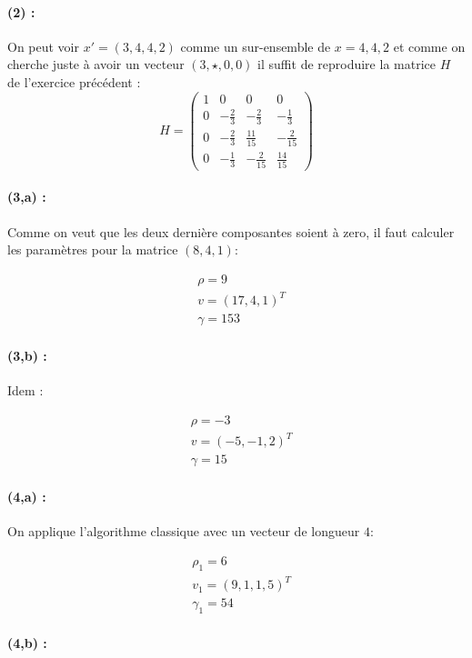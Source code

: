 \documentclass[11pt,a4paper]{report}
\begin{document}
\paragraph*{(2) : } On peut voir $x'=(3,4,4,2)$ comme un sur-ensemble de $x=4,4,2$ et comme on cherche juste à avoir un vecteur $(3,\star,0,0)$ il suffit de reproduire la matrice $H$ de l'exercice précédent :
$$
H = \begin{pmatrix}
1 & 0 & 0 & 0 \\
0 &-\frac{2}{3} & -\frac{2}{3} & -\frac{1}{3} \\
0 &-\frac{2}{3} & \frac{11}{15} & -\frac{2}{15} \\
0 &-\frac{1}{3} & -\frac{2}{15} & \frac{14}{15}
\end{pmatrix}
$$

\paragraph*{(3,a) : } Comme on veut que les deux dernière composantes soient à zero, il faut calculer les paramètres pour la matrice $(8,4,1)$:

\begin{align*}
& \rho = 9 \\
& v = (17,4,1)^T \\
& \gamma = 153
\end{align*}

\paragraph*{(3,b) : } Idem :

\begin{align*}
& \rho = -3 \\
& v = (-5,-1,2)^T \\
& \gamma = 15
\end{align*}

\paragraph*{(4,a) : } On applique l'algorithme classique avec un vecteur de longueur $4$:

\begin{align*}
& \rho_1 = 6 \\
& v_1 = (9,1,1,5)^T \\
& \gamma_1 = 54
\end{align*}

\paragraph*{(4,b) : } 
\end{document}
